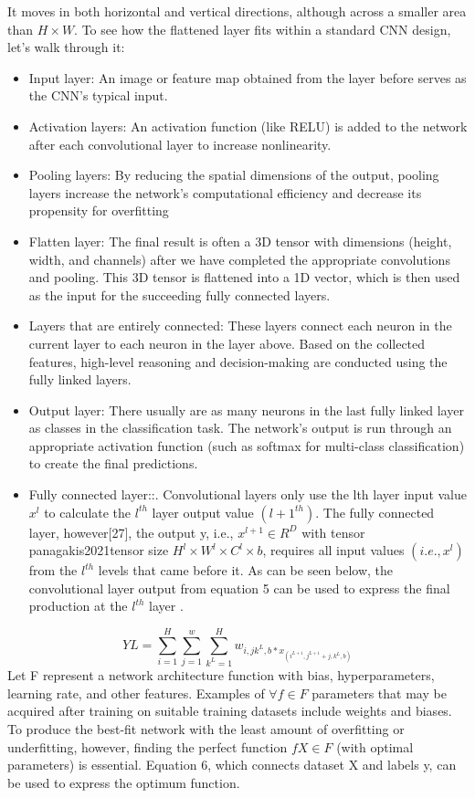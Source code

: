 \documentclass[a4paper,fleqn]{cas-sc}
\begin{document}
It moves in both horizontal and vertical directions, although across a smaller area than $H×W$.                                   To see how the flattened layer fits within a standard CNN design, let's walk through it:
\begin{itemize}
\item Input layer: An image or feature map obtained from the layer before serves as the CNN's typical input.
\item Activation layers: An activation function (like RELU) is added to the network after each convolutional layer to increase nonlinearity\cite{o2015introduction}.
\item Pooling layers: By reducing the spatial dimensions of the output, pooling layers increase the network's computational efficiency and decrease its propensity for overfitting \cite{gholamalinezhad2020pooling, zafar2022comparison, zeiler2013stochastic}\\
\item Flatten layer: The final result is often a 3D tensor with dimensions (height, width, and channels) after we have completed the appropriate convolutions and pooling. This 3D tensor is flattened into a 1D vector, which is then used as the input for the succeeding fully connected layers.
\item Layers that are entirely connected: These layers connect each neuron in the current layer to each neuron in the layer above. Based on the collected features, high-level reasoning and decision-making are conducted using the fully linked layers.
\item Output layer: There usually are as many neurons in the last fully linked layer as classes in the classification task. The network's output is run through an appropriate activation function (such as softmax for multi-class classification) to create the final predictions.
\item Fully connected layer::. Convolutional layers only use the lth layer input value $x^l$  to calculate the $l^{th}$   layer output value $(l+1^{th})$. The fully connected layer, however[27], the output y, i.e., $x^{l+1} \in R^D$ with tensor panagakis2021tensor size ${H^l×W^l×C^l ×b}$, requires all input values $(i.e.,{x^l})$ from the $l^{th}$  levels that came before it. As can be seen below, the convolutional layer output from equation 5 can be used to express the final production at the $l^{th}$ layer \cite{basha2020impact}.
\end{itemize}
 \begin{equation}
	YL=\sum_{i=1}^{H}\sum_{j=1}^{w}\sum_{k^L=1}^{H} w_{i,jk^L,b*x_{(i^{L+1},j^{L+1}+j,k^L,b)}}
\end{equation}
Let F represent a network architecture function with bias, hyperparameters, learning rate, and other features.   Examples of  $\forall f \in F$  parameters that may be acquired after training on suitable training datasets include weights and biases. To produce the best-fit network with the least amount of overfitting or underfitting, however, finding the perfect function $f X \in F$ (with optimal parameters) is essential. Equation 6, which connects dataset X and labels y, can be used to express the optimum function.
\end{document}
